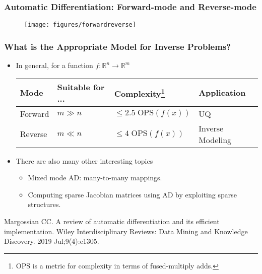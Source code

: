 \documentclass[usenames,dvipsnames]{beamer}
\newcommand{\RR}[0]{\mathbb{R}}
\begin{document}
\begin{frame}
	\frametitle{Automatic Differentiation: Forward-mode and Reverse-mode}
	\begin{figure}
		\centering
		\texttt{[image: figures/forwardreverse]}
	\end{figure}
\end{frame}



\begin{frame}
	\frametitle{What is the Appropriate Model for Inverse Problems?}
	
	\begin{itemize}
		\item In general, for a function $f:\RR^n \rightarrow \RR^m$
		\begin{table}[]
			\centering
			\begin{tabular}{@{}llll@{}}
				\toprule
				Mode & Suitable for ... & Complexity\footnote{$\mathrm{OPS}$ is a metric for complexity in terms of fused-multiply adds.} & Application \\ \midrule
				Forward & $m\gg n$ & $\leq 2.5\;\mathrm{OPS}(f(x))$ & UQ \\
				Reverse & $m\ll n$ & $\leq 4\;\mathrm{OPS}(f(x))$ & Inverse Modeling \\ \bottomrule
			\end{tabular}
		\end{table}
		
		
		\item There are also many other interesting topics
		\begin{itemize}
			\item Mixed mode AD: many-to-many mappings.
			\item Computing sparse Jacobian matrices using AD by exploiting sparse structures. 
		\end{itemize}
	\end{itemize}
	{\scriptsize Margossian CC. A review of automatic differentiation and its efficient implementation. Wiley Interdisciplinary Reviews: Data Mining and Knowledge Discovery. 2019 Jul;9(4):e1305.} 
\end{frame}
\end{document}

